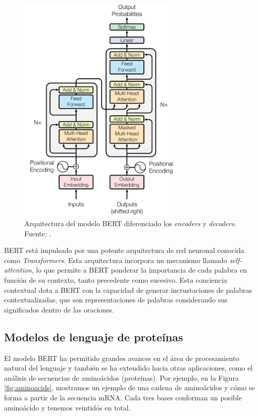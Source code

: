 \begin{figure}[H]
	\centering\includegraphics[width=0.7\textwidth]{../img/proposal/bert}
	\caption[Arquitectura del modelo BERT]{Arquitectura del modelo BERT diferenciado los \textit{encoders} y \textit{decoders}. Fuente: \cite{devlin2018bert}.}
	\label{fig:bert_paper}
\end{figure}


BERT está impulsado por una potente arquitectura de red neuronal conocida como \textit{Transformers}. Esta arquitectura incorpora un mecanismo llamado \textit{self-attention}, lo que permite a BERT ponderar la importancia de cada palabra en función de su contexto, tanto precedente como sucesivo. Esta conciencia contextual dota a BERT con la capacidad de generar incrustaciones de palabras contextualizadas, que son representaciones de palabras considerando sus significados dentro de las oraciones. 

\subsection{Modelos de lenguaje de proteínas}

El modelo BERT ha permitido grandes avances en el área de procesamiento natural del lenguaje y también se ha extendido hacia otras aplicaciones, como el análisis de secuencias de aminoácidos (proteínas). Por ejemplo, en la Figura \ref{fig:aminoacids}, mostramos un ejemplo de una cadena de aminoácidos y cómo se forma a partir de la secuencia mRNA. Cada tres bases conforman un posible aminoácido y tenemos veintidós en total.


